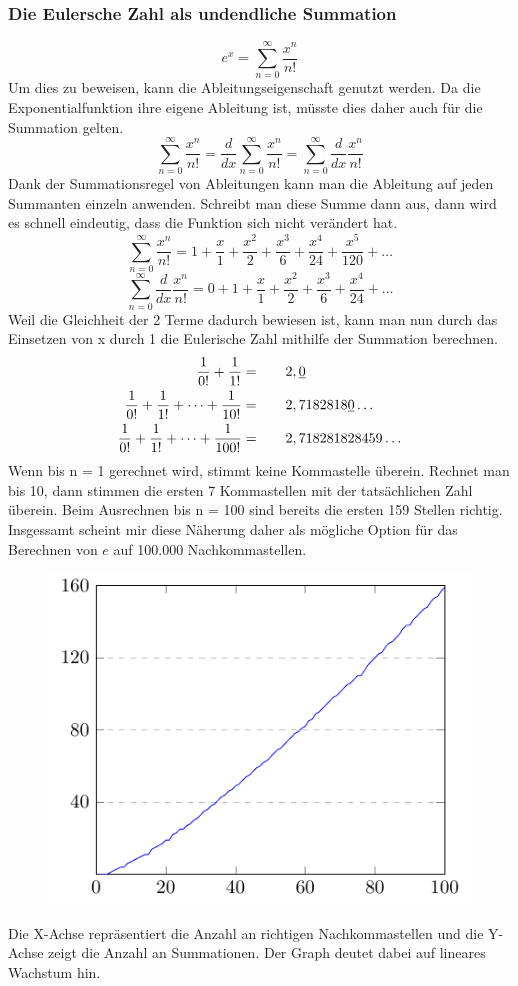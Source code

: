 \subsubsection{Die Eulersche Zahl als undendliche Summation}
\[e^x = \sum_{n=0}^\infty \frac{x^n}{n!}
  \]Um dies zu beweisen, kann die Ableitungseigenschaft genutzt werden. Da die Exponentialfunktion ihre eigene Ableitung ist, müsste dies daher auch für die Summation gelten.  \[
  \sum_{n=0}^\infty \frac{x^n}{n!} = \frac{d}{dx}\sum_{n=0}^\infty \frac{x^n}{n!} = \sum_{n=0}^\infty \frac{d}{dx}\frac{x^n}{n!} 
  \] Dank der Summationsregel von Ableitungen kann man die Ableitung auf jeden Summanten einzeln anwenden. Schreibt man diese Summe dann aus, dann wird es schnell eindeutig, dass die Funktion sich nicht verändert hat. \[
  \sum_{n=0}^\infty \frac{x^n}{n!} = 1 + \frac{x}{1} + \frac{x^2}{2} + \frac{x^3}{6} + \frac{x^4}{24} + \frac{x^5}{120} + \dots
  \] \[
  \sum_{n=0}^\infty \frac{d}{dx}\frac{x^{n}}{n!} = 0 +  1 + \frac{x}{1} + \frac{x^2}{2} + \frac{x^3}{6} + \frac{x^4}{24} + \dots
\]Weil die Gleichheit der 2 Terme dadurch bewiesen ist, kann man nun durch das Einsetzen von x durch 1 die Eulerische Zahl mithilfe der Summation berechnen. \[
  \begin{aligned}
    \frac{1}{0!} + \frac{1}{1!} = \indent\crel{2},\underline{0}\\
    \frac{1}{0!} + \frac{1}{1!} + \dots + \frac{1}{10!} =  \indent\crel{2},7182818\underline{0}\dots\\
    \frac{1}{0!} + \frac{1}{1!} + \dots + \frac{1}{100!} = \indent\crel{2},718281828459\dots
  \end{aligned}
\] \newpage
Wenn bis n = 1 gerechnet wird, stimmt keine Kommastelle überein. Rechnet man bis 10, dann stimmen die ersten 7 Kommastellen mit der tatsächlichen Zahl überein. Beim Ausrechnen bis n = 100 sind bereits die ersten 159 Stellen richtig. Insgessamt scheint mir diese Näherung daher als mögliche Option für das Berechnen von $e$ auf 100.000 Nachkommastellen.
\begin{figure}[h]
  \includegraphics{medien2/summation/summation.pdf}
  \centering
\end{figure}
\par Die X-Achse repräsentiert die Anzahl an richtigen Nachkommastellen und die Y-Achse zeigt die Anzahl an Summationen. Der Graph deutet dabei auf lineares Wachstum hin.
